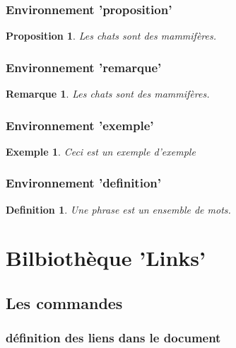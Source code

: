 \documentclass[12pt]{report}
\newtheorem{proposition}{Proposition}
\newtheorem{remarque}{Remarque}
\newtheorem{exemple}{Exemple}
\newtheorem{definition}{Definition}%
\begin{document}
\subsection{Environnement 'proposition' }

\begin{proposition}
Les chats sont des mammifères.
\end{proposition}

\subsection{Environnement 'remarque' }

\begin{remarque}
Les chats sont des mammifères.
\end{remarque}

\subsection{Environnement 'exemple' }

\begin{exemple}
Ceci est un exemple d'exemple
\end{exemple}

\subsection{Environnement 'definition' }

\begin{definition}
Une phrase est un ensemble de mots.
\end{definition}



\chapter{Bilbiothèque 'Links'}


\section{Les commandes}


\subsection{définition des liens dans le document}
\end{document}
